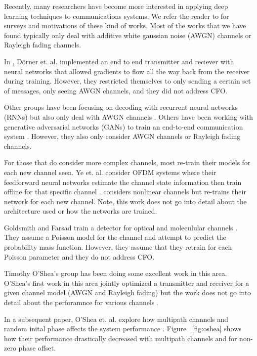 Recently, many researchers have become more interested in applying deep learning techniques to communications systems.  
We refer the reader to \cite{botoca}\cite{diamandis}\cite{wang}\cite{hemodel}\cite{osheaphys} for surveys and motivations of these kind of works.  
Most of the works that we have found typically only deal with additive white gaussian noise (AWGN) channels or Rayleigh fading channels.

In \cite{dorner2017}, D\"{o}rner et. al. implemented an end to end transmitter and reciever with neural networks that allowed gradients to flow all the way back from the receiver during training.  
However, they restricted themselves to only sending a certain set of messages, only seeing AWGN channels, and they did not address CFO. 

Other groups have been focusing on decoding with recurrent neural networks (RNNs) but also only deal with AWGN channels \cite{kim2018}\cite{kimnips}.  
Others have been working with generative adversarial networks (GANs) to train an end-to-end communication system \cite{yegans}.  However, they also only consider AWGN channels or Rayleigh fading channels.

For those that do consider more complex channels, most re-train their models for each new channel seen.  Ye et. al. consider OFDM systems where their feedforward neural networks estimate the channel state information then train offline for that specific channel \cite{ye2018}.  
\cite{raghavendra} considers nonlinear channels but re-trains their network for each new channel.  Note, this work does not go into detail about the architecture used or how the networks are trained. 

Goldsmith and Farsad train a detector for optical and moleculular channels \cite{farsad2018}.  They assume a Poisson model for the channel and attempt to predict the probability mass function.  However, they assume that they retrain for each Poisson parameter and they do not address CFO.

Timothy O'Shea's group has been doing some excellent work in this area. 
O'Shea's first work in this area jointly optimized a transmitter and receiver for a given channel model (AWGN and Rayleigh fading) but the work does not go into detail about the perforamnce for various channels \cite{osheaphys}.

In a subsequent paper, O'Shea et. al. explore how multipath channels and random inital phase affects the system performance \cite{osheaatt}.  Figure ~\ref{fig:oshea} shows how their performance drastically decreased with multipath channels and for non-zero phase offset.

